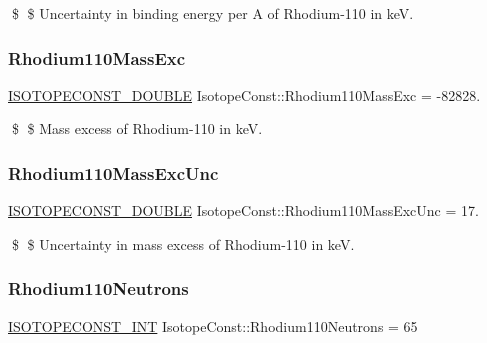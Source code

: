 \$ \$ Uncertainty in binding energy per A of Rhodium-\/110 in keV. \mbox{\label{group___isotope_const-_rhodium-_rh110_ga0cd8e9c668970f4a0f5ec7d2d4f4f053}} 
\subsubsection{\texorpdfstring{Rhodium110\+Mass\+Exc}{Rhodium110MassExc}}
{\footnotesize\ttfamily \mbox{\hyperlink{group___isotope_const-_macros_ga8f45a7272ce02c0b4c65c44636ed719a}{I\+S\+O\+T\+O\+P\+E\+C\+O\+N\+S\+T\+\_\+\+D\+O\+U\+B\+LE}} Isotope\+Const\+::\+Rhodium110\+Mass\+Exc = -\/82828.}

\$ \$ Mass excess of Rhodium-\/110 in keV. \mbox{\label{group___isotope_const-_rhodium-_rh110_ga7dea6c002be6ac709b7c531b7c5a6ac6}} 
\subsubsection{\texorpdfstring{Rhodium110\+Mass\+Exc\+Unc}{Rhodium110MassExcUnc}}
{\footnotesize\ttfamily \mbox{\hyperlink{group___isotope_const-_macros_ga8f45a7272ce02c0b4c65c44636ed719a}{I\+S\+O\+T\+O\+P\+E\+C\+O\+N\+S\+T\+\_\+\+D\+O\+U\+B\+LE}} Isotope\+Const\+::\+Rhodium110\+Mass\+Exc\+Unc = 17.}

\$ \$ Uncertainty in mass excess of Rhodium-\/110 in keV. \mbox{\label{group___isotope_const-_rhodium-_rh110_ga2565dd69231752ddf21b42c6c770a53d}} 
\subsubsection{\texorpdfstring{Rhodium110\+Neutrons}{Rhodium110Neutrons}}
{\footnotesize\ttfamily \mbox{\hyperlink{group___isotope_const-_macros_ga5f18360b3e99483a35c32d789e62621c}{I\+S\+O\+T\+O\+P\+E\+C\+O\+N\+S\+T\+\_\+\+I\+NT}} Isotope\+Const\+::\+Rhodium110\+Neutrons = 65}

